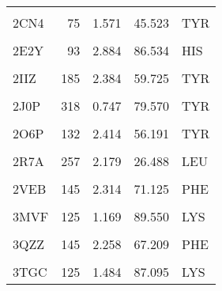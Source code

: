 \begin{table}
{\begin{tabular}{lrrrl}
				\cellcolor{gray!6}{2CJ0} & \cellcolor{gray!6}{108} & \cellcolor{gray!6}{2.241} & \cellcolor{gray!6}{56.216} & \cellcolor{gray!6}{SER}\\
				2CN4 & 75 & 1.571 & 45.523 & TYR\\
				\cellcolor{gray!6}{2CPO} & \cellcolor{gray!6}{108} & \cellcolor{gray!6}{2.167} & \cellcolor{gray!6}{52.106} & \cellcolor{gray!6}{SER}\\
				2E2Y & 93 & 2.884 & 86.534 & HIS\\
				\addlinespace
				\cellcolor{gray!6}{2FC2} & \cellcolor{gray!6}{56} & \cellcolor{gray!6}{1.708} & \cellcolor{gray!6}{58.198} & \cellcolor{gray!6}{TRP}\\
				2IIZ & 185 & 2.384 & 59.725 & TYR\\
				\cellcolor{gray!6}{2IPS} & \cellcolor{gray!6}{101} & \cellcolor{gray!6}{3.075} & \cellcolor{gray!6}{84.120} & \cellcolor{gray!6}{MET}\\
				2J0P & 318 & 0.747 & 79.570 & TYR\\
				\cellcolor{gray!6}{2J18} & \cellcolor{gray!6}{108} & \cellcolor{gray!6}{2.222} & \cellcolor{gray!6}{55.263} & \cellcolor{gray!6}{SER}\\
				\addlinespace
				2O6P & 132 & 2.414 & 56.191 & TYR\\
				\cellcolor{gray!6}{2Q6N} & \cellcolor{gray!6}{303} & \cellcolor{gray!6}{1.595} & \cellcolor{gray!6}{56.344} & \cellcolor{gray!6}{THR}\\
				2R7A & 257 & 2.179 & 26.488 & LEU\\
				\cellcolor{gray!6}{2SPL} & \cellcolor{gray!6}{93} & \cellcolor{gray!6}{2.890} & \cellcolor{gray!6}{88.954} & \cellcolor{gray!6}{HIS}\\
				2VEB & 145 & 2.314 & 71.125 & PHE\\
				\addlinespace
				\cellcolor{gray!6}{3HX9} & \cellcolor{gray!6}{81} & \cellcolor{gray!6}{2.600} & \cellcolor{gray!6}{86.961} & \cellcolor{gray!6}{ASN}\\
				3MVF & 125 & 1.169 & 89.550 & LYS\\
				\cellcolor{gray!6}{3QZN} & \cellcolor{gray!6}{83} & \cellcolor{gray!6}{2.699} & \cellcolor{gray!6}{67.495} & \cellcolor{gray!6}{HIS}\\
				3QZZ & 145 & 2.258 & 67.209 & PHE\\
				\cellcolor{gray!6}{3SIK} & \cellcolor{gray!6}{136} & \cellcolor{gray!6}{2.207} & \cellcolor{gray!6}{52.942} & \cellcolor{gray!6}{TYR}\\
				\addlinespace
				3TGC & 125 & 1.484 & 87.095 & LYS\\

\end{tabular}}
\end{table}

